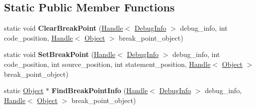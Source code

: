 \subsection*{Static Public Member Functions}
\begin{DoxyCompactItemize}
\item 
\hypertarget{classv8_1_1internal_1_1_debug_info_a1de3e002af547004c0680ef95d09972a}{}static void {\bfseries Clear\+Break\+Point} (\hyperlink{classv8_1_1internal_1_1_handle}{Handle}$<$ \hyperlink{classv8_1_1internal_1_1_debug_info}{Debug\+Info} $>$ debug\+\_\+info, int code\+\_\+position, \hyperlink{classv8_1_1internal_1_1_handle}{Handle}$<$ \hyperlink{classv8_1_1internal_1_1_object}{Object} $>$ break\+\_\+point\+\_\+object)\label{classv8_1_1internal_1_1_debug_info_a1de3e002af547004c0680ef95d09972a}

\item 
\hypertarget{classv8_1_1internal_1_1_debug_info_a42cd43f662458f49074e753567306a71}{}static void {\bfseries Set\+Break\+Point} (\hyperlink{classv8_1_1internal_1_1_handle}{Handle}$<$ \hyperlink{classv8_1_1internal_1_1_debug_info}{Debug\+Info} $>$ debug\+\_\+info, int code\+\_\+position, int source\+\_\+position, int statement\+\_\+position, \hyperlink{classv8_1_1internal_1_1_handle}{Handle}$<$ \hyperlink{classv8_1_1internal_1_1_object}{Object} $>$ break\+\_\+point\+\_\+object)\label{classv8_1_1internal_1_1_debug_info_a42cd43f662458f49074e753567306a71}

\item 
\hypertarget{classv8_1_1internal_1_1_debug_info_a1c5334807745bfdf7c4771f178bc13d9}{}static \hyperlink{classv8_1_1internal_1_1_object}{Object} $\ast$ {\bfseries Find\+Break\+Point\+Info} (\hyperlink{classv8_1_1internal_1_1_handle}{Handle}$<$ \hyperlink{classv8_1_1internal_1_1_debug_info}{Debug\+Info} $>$ debug\+\_\+info, \hyperlink{classv8_1_1internal_1_1_handle}{Handle}$<$ \hyperlink{classv8_1_1internal_1_1_object}{Object} $>$ break\+\_\+point\+\_\+object)\label{classv8_1_1internal_1_1_debug_info_a1c5334807745bfdf7c4771f178bc13d9}

\end{DoxyCompactItemize}
